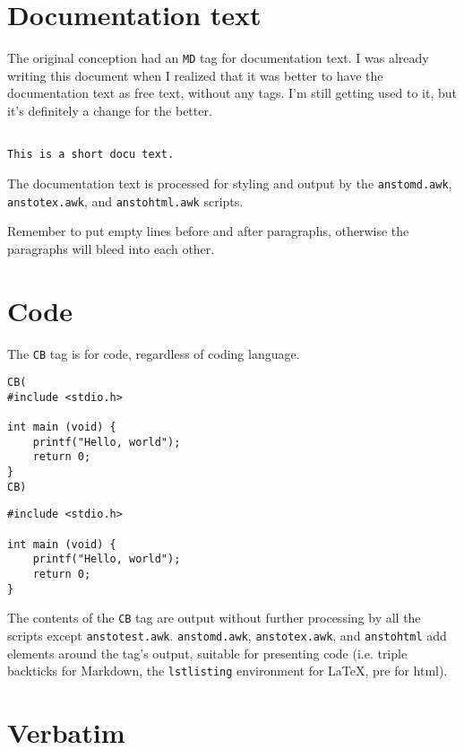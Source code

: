 \section{Documentation text}
\label{documentation-text}

The original conception had an \texttt{MD} tag for documentation text. I was already writing this document when I realized that it was better to have the documentation text as free text, without any tags. I'm still getting used to it, but it's definitely a change for the better.

\begin{verbatim}

This is a short docu text.

\end{verbatim}

The documentation text is processed for styling and output by the \texttt{anstomd.awk}, \texttt{anstotex.awk}, and \texttt{anstohtml.awk} scripts.


Remember to put empty lines before and after paragraphs, otherwise the paragraphs will bleed into each other.

\section{Code}
\label{code}

The \texttt{CB} tag is for code, regardless of coding language.

\begin{verbatim}
CB(
#include <stdio.h>

int main (void) {
    printf("Hello, world");
    return 0;
}
CB)
\end{verbatim}
\begin{lstlisting}
#include <stdio.h>

int main (void) {
    printf("Hello, world");
    return 0;
}
\end{lstlisting}

The contents of the \texttt{CB} tag are output without further processing by all the scripts except \texttt{anstotest.awk}. \texttt{anstomd.awk}, \texttt{anstotex.awk}, and \texttt{anstohtml} add elements around the tag's output, suitable for presenting code (i.e. triple backticks for Markdown, the \texttt{lstlisting} environment for \LaTeX{}, pre for html).

\section{Verbatim}
\label{verbatim}

